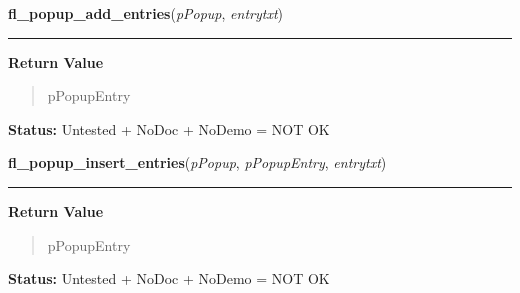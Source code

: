     \label{xformslib:library:fl_popup_add_entries}

    \vspace{0.5ex}

\hspace{.8\funcindent}\begin{boxedminipage}{\funcwidth}

    \raggedright \textbf{fl\_popup\_add\_entries}(\textit{pPopup}, \textit{entrytxt})

    \vspace{-1.5ex}

    \rule{\textwidth}{0.5\fboxrule}
\setlength{\parskip}{2ex}
\setlength{\parskip}{1ex}
      \textbf{Return Value}
    \vspace{-1ex}

      \begin{quote}
      pPopupEntry

      \end{quote}

\textbf{Status:} Untested + NoDoc + NoDemo = NOT OK



    \end{boxedminipage}

    \label{xformslib:library:fl_popup_insert_entries}

    \vspace{0.5ex}

\hspace{.8\funcindent}\begin{boxedminipage}{\funcwidth}

    \raggedright \textbf{fl\_popup\_insert\_entries}(\textit{pPopup}, \textit{pPopupEntry}, \textit{entrytxt})

    \vspace{-1.5ex}

    \rule{\textwidth}{0.5\fboxrule}
\setlength{\parskip}{2ex}
\setlength{\parskip}{1ex}
      \textbf{Return Value}
    \vspace{-1ex}

      \begin{quote}
      pPopupEntry

      \end{quote}

\textbf{Status:} Untested + NoDoc + NoDemo = NOT OK



    \end{boxedminipage}

